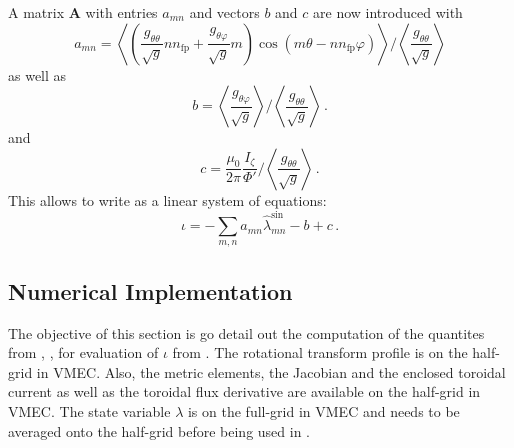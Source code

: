 A matrix $\mathbf{A}$ with entries $a_{mn}$ and vectors $b$ and $c$ are now introduced with
\begin{equation}
 a_{mn} = \left\langle \left(  \frac{g_{\theta  \theta }}{\sqrt{g}} n n_\textrm{fp}
                                   + \frac{g_{\theta  \varphi}}{\sqrt{g}} m
                             \right) \cos\left(m \theta - n n_\textrm{fp} \varphi \right) \right\rangle
          /
          \left\langle \frac{g_{\theta  \theta}}{\sqrt{g}} \right\rangle \label{eqn:a_mat}
\end{equation}
as well as
\begin{equation}
 b = \left\langle \frac{g_{\theta  \varphi}}{\sqrt{g}} \right\rangle
     /
     \left\langle \frac{g_{\theta  \theta}}{\sqrt{g}} \right\rangle \label{eqn:b_vec} \, .
\end{equation}
and
\begin{equation}
 c = \frac{\mu_0}{2 \pi} \frac{I_\zeta}{\Phi'}
     /
     \left\langle \frac{g_{\theta  \theta}}{\sqrt{g}} \right\rangle \label{eqn:c_vec} \, .
\end{equation}
This allows to write  as a linear system of equations:
\begin{equation}
 \iota = -\sum\limits_{m,n} a_{mn} \hat{\lambda}^{\sin}_{mn} - b + c \label{eqn:iota_from_linear_eqns} \, .
\end{equation}
%

\subsection{Numerical Implementation}
The objective of this section is go detail out the computation of
the quantites from , ,  for evaluation of $\iota$
from .
%
The rotational transform profile is on the half-grid in VMEC.
Also, the metric elements, the Jacobian and the enclosed toroidal current as well as the toroidal flux derivative
are available on the half-grid in VMEC.
The state variable $\lambda$ is on the full-grid in VMEC
and needs to be averaged onto the half-grid before being used in .




